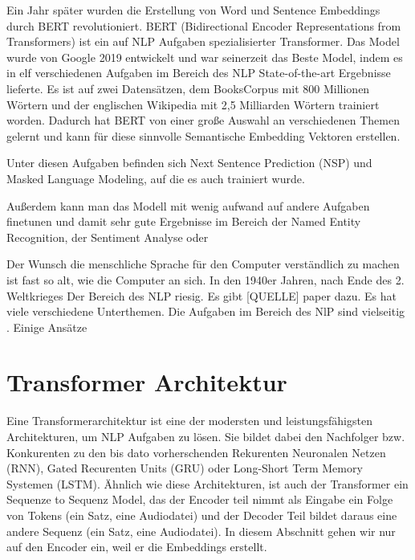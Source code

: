 Ein Jahr später wurden die Erstellung von Word und Sentence Embeddings durch BERT revolutioniert.
BERT (Bidirectional Encoder Representations from Transformers) \cite{devlin2019} ist ein auf NLP Aufgaben spezialisierter Transformer.
Das Model wurde von Google 2019 entwickelt und war seinerzeit das Beste Model, indem es in elf verschiedenen Aufgaben im Bereich des NLP State-of-the-art Ergebnisse lieferte.
Es ist auf zwei Datensätzen, dem BooksCorpus mit 800 Millionen Wörtern und der englischen Wikipedia mit 2,5 Milliarden Wörtern trainiert worden. \cite{devlin2019}
Dadurch hat BERT von einer große Auswahl an verschiedenen Themen gelernt und kann für diese sinnvolle Semantische Embedding Vektoren erstellen.













Unter diesen Aufgaben befinden sich Next Sentence Prediction (NSP) und Masked Language Modeling, auf die es auch trainiert wurde.



Außerdem kann man das Modell mit wenig aufwand auf andere Aufgaben finetunen und damit sehr gute Ergebnisse im Bereich der Named Entity Recognition, der Sentiment Analyse oder  










Der Wunsch die menschliche Sprache für den Computer verständlich zu machen ist fast so alt, wie die Computer an sich. 
In den 1940er Jahren, nach Ende des 2. Weltkrieges 
Der Bereich des NLP riesig. 
Es gibt [QUELLE] paper dazu. 
Es hat viele verschiedene Unterthemen. 
Die Aufgaben im Bereich des NlP sind vielseitig . Einige Ansätze 






\section{Transformer Architektur}


Eine Transformerarchitektur ist eine der modersten und leistungsfähigsten Architekturen, um NLP Aufgaben zu lösen. 
Sie bildet dabei den Nachfolger bzw. Konkurenten zu den bis dato vorherschenden Rekurenten Neuronalen Netzen (RNN), Gated Recurenten Units (GRU) oder Long-Short Term Memory Systemen (LSTM). 
Ähnlich wie diese Architekturen, ist auch der Transformer ein Sequenze to Sequenz Model, das der Encoder teil nimmt als Eingabe ein Folge von Tokens (ein Satz, eine Audiodatei) und der Decoder Teil bildet daraus eine andere Sequenz (ein Satz, eine Audiodatei). 
In diesem Abschnitt gehen wir nur auf den Encoder ein, weil er die Embeddings erstellt.

